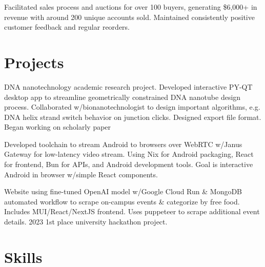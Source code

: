 \documentclass[letterpaper, 10pt]{article}
\begin{document}
{Facilitated sales process and auctions for over 100 buyers, generating \$6,000+ in revenue with around 200 unique accounts sold. Maintained consistently positive customer feedback and regular reorders.}
\resumeItemListEnd

\resumeSubHeadingListEnd

\section{Projects}
\resumeSubHeadingListStart
{}
{DNA nanotechnology academic research project. Developed interactive PY-QT desktop app to streamline geometrically constrained DNA nanotube design process. Collaborated w/bionanotechnologist to design important algorithms, e.g. DNA helix strand switch behavior on junction clicks. Designed export file format. Began working on scholarly paper}


{Developed toolchain to stream Android to browsers over WebRTC w/Janus Gateway for low-latency video stream. Using Nix for Android packaging, React for frontend, Bun for APIs, and Android development tools. Goal is interactive Android in browser w/simple React components.}

{Website using fine-tuned OpenAI model w/Google Cloud Run \& MongoDB automated workflow to scrape on-campus events \& categorize by free food. Includes MUI/React/NextJS frontend. Uses puppeteer to scrape additional event details. 2023 1st place university hackathon project.}
\resumeSubHeadingListEnd

\section{Skills}
\resumeSubHeadingListStart
{}
\end{document}
